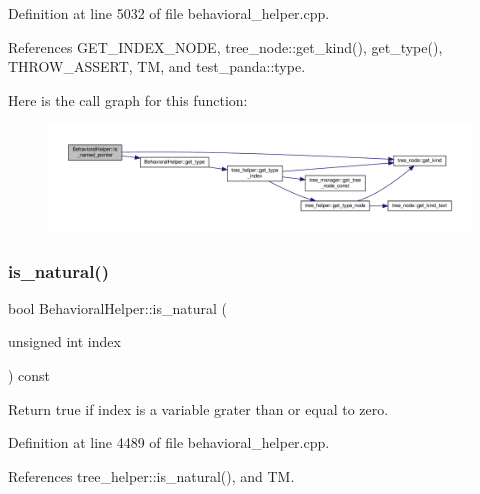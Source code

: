 Definition at line 5032 of file behavioral\+\_\+helper.\+cpp.



References G\+E\+T\+\_\+\+I\+N\+D\+E\+X\+\_\+\+N\+O\+DE, tree\+\_\+node\+::get\+\_\+kind(), get\+\_\+type(), T\+H\+R\+O\+W\+\_\+\+A\+S\+S\+E\+RT, TM, and test\+\_\+panda\+::type.

Here is the call graph for this function\+:
\nopagebreak
\begin{figure}[H]
\begin{center}
\leavevmode
\includegraphics[width=350pt]{dd/db2/classBehavioralHelper_a599b68e8bc619c214160051c6e931bec_cgraph}
\end{center}
\end{figure}
\mbox{\label{classBehavioralHelper_afd32eb4b60122768233ad5dca8a822ab}} 
\subsubsection{\texorpdfstring{is\+\_\+natural()}{is\_natural()}}
{\footnotesize\ttfamily bool Behavioral\+Helper\+::is\+\_\+natural (\begin{DoxyParamCaption}\item[{unsigned int}]{index }\end{DoxyParamCaption}) const\hspace{0.3cm}{\ttfamily [virtual]}}



Return true if index is a variable grater than or equal to zero. 



Definition at line 4489 of file behavioral\+\_\+helper.\+cpp.



References tree\+\_\+helper\+::is\+\_\+natural(), and TM.

